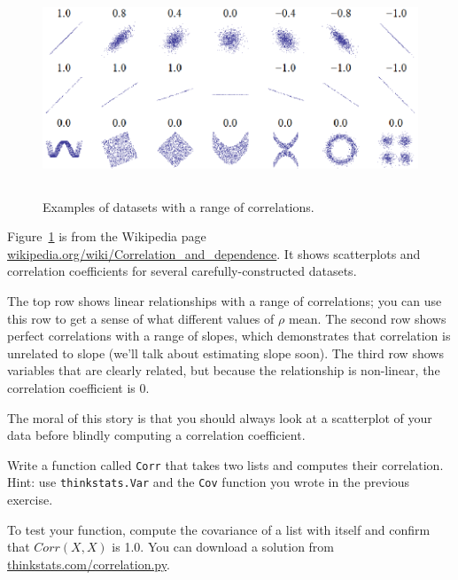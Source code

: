 \documentclass[12pt]{book}
\begin{document}

\begin{figure}
\centerline{\includegraphics[height=2.5in]{figs/Correlation_examples.eps}}
\caption{Examples of datasets with a range of correlations.}
\label{corr_examples}
\end{figure}

Figure~\ref{corr_examples} is from the Wikipedia page
\url{wikipedia.org/wiki/Correlation_and_dependence}.  It shows
scatterplots and correlation coefficients for several
carefully-constructed datasets.



The top row shows linear relationships with a range of correlations;
you can use this row to get a sense of what different values of $\rho$
mean.  The second row shows perfect correlations with a range of
slopes, which demonstrates that correlation is unrelated to slope
(we'll talk about estimating slope soon).  The third
row shows variables that are clearly related, but because the
relationship is non-linear, the correlation coefficient is 0.

The moral of this story is that you should always look at a scatterplot of
your data before blindly computing a correlation coefficient.


\begin{ex}

Write a function called {\tt Corr} that takes two lists and
computes their correlation.  Hint: use {\tt thinkstats.Var} and
the {\tt Cov} function you wrote in the previous exercise.


To test your function, compute the covariance of a list with itself
and confirm that $Corr(X, X)$ is 1.0.  You can download a solution
from \url{thinkstats.com/correlation.py}.


\end{ex}
\end{document}

